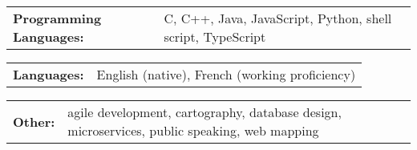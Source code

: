 \documentclass[10pt]{article}
\begin{document}
		\vspace{5pt}
		\noindent
		\begin{tabular}{@{}l@{\ }l}
		\textbf{Programming Languages: } & C, C++, Java, JavaScript, Python, shell script, TypeScript\\
		\end{tabular}
		
		\vspace{5pt}
		\noindent
		\begin{tabular}{@{}l@{\ }l}
		\textbf{Languages: } & English (native), French (working proficiency) \\
		\end{tabular}
		
		\vspace{5pt}
		\noindent
		\begin{tabular}{@{}l@{\ }l}
		\textbf{Other: } &  agile development, cartography, database design, microservices, public speaking, web mapping \\
		\end{tabular}
			
\end{document}
